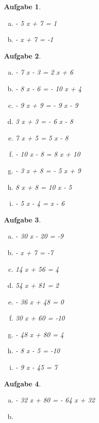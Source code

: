 \documentclass[12pt,fleqn]{article}
\theoremstyle{aufg}
\newtheorem{aufgabe}{Aufgabe}
\theoremstyle{bsp}
\begin{document}
\begin{flushleft}
\begin{aufgabe}
\begin{multicols}{3}
\begin{enumerate}[a)]
- 6 x - 9 = 6
\item 
- 5 x + 7 = 1
\item 
- x + 7 = -1
\end{enumerate} 
\end{multicols} 
\end{aufgabe} 
\begin{aufgabe} ~ \\ 
\begin{multicols}{3} 
\begin{enumerate}[a)] 
\item 
- 7 x - 3 = 2 x + 6
\item 
- 8 x - 6 = - 10 x + 4
\item 
- 9 x + 9 = - 9 x - 9
\item 
3 x + 3 = - 6 x - 8
\item 
7 x + 5 = 5 x - 8
\item 
- 10 x - 8 = 8 x + 10
\item 
- 3 x + 8 = - 5 x + 9
\item 
8 x + 8 = 10 x - 5
\item 
- 5 x - 4 = x - 6
\end{enumerate} 
\end{multicols} 
\end{aufgabe} 
\begin{aufgabe} ~ \\ 
\begin{multicols}{3} 
\begin{enumerate}[a)] 
\item 
- 30 x - 20 = -9
\item 
- x + 7 = -7
\item 
14 x + 56 = 4
\item 
54 x + 81 = 2
\item 
- 36 x + 48 = 0
\item 
30 x + 60 = -10
\item 
- 48 x + 80 = 4
\item 
- 8 x - 5 = -10
\item 
- 9 x - 45 = 7
\end{enumerate} 
\end{multicols} 
\end{aufgabe} 
\begin{aufgabe} ~ \\ 
\begin{multicols}{2} 
\begin{enumerate}[a)] 
\item 
- 32 x + 80 = - 64 x + 32
\item 

\end{enumerate}
\end{multicols}
\end{aufgabe}
\end{flushleft}
\end{document}
